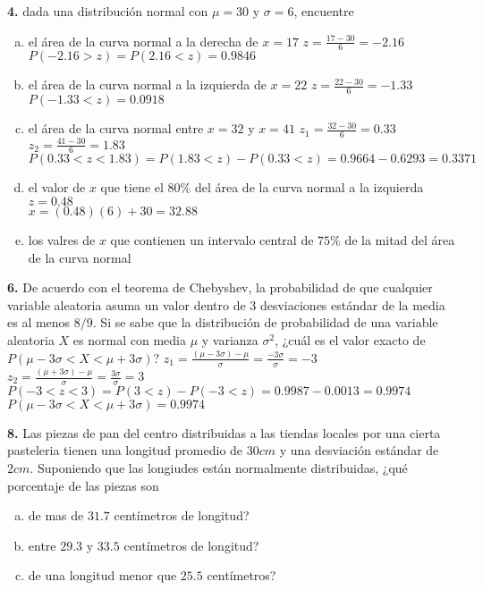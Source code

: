 \documentclass[12pt, letterpaper]{article}
\begin{document}
    \textbf{4. } dada una distribución normal con $\mu = 30$ y $\sigma = 6$, encuentre
        \begin{enumerate}[a)]
            \item el área de la curva normal a la derecha de $x=17$\vskip0.5cm
                $z=\displaystyle\frac{17-30}{6}=-2.16$\vskip0.5cm
                $P(-2.16>z)=P(2.16<z)=0.9846$
            \item el área de la curva normal a la izquierda de $x=22$\vskip0.5cm
                $z=\displaystyle\frac{22-30}{6}=-1.33$\vskip0.5cm
                $P(-1.33<z)=0.0918$
            \item el área de la curva normal entre $x=32$ y $x=41$\vskip0.5cm
                $z_1=\displaystyle\frac{32-30}{6}=0.33$\vskip0.5cm
                $z_2=\displaystyle\frac{41-30}{6}=1.83$\vskip0.5cm
                $P(0.33<z<1.83)=P(1.83<z)-P(0.33<z)=0.9664-0.6293=0.3371$
            \item el valor de $x$ que tiene el $80\%$ del área de la curva normal a la izquierda\\
                $z=0.48$\\
                $x=(0.48)(6)+30=32.88$
            \item los valres de $x$ que contienen un intervalo central de $75\%$ de la mitad del área de la curva normal

        \end{enumerate}\vskip1cm

    \textbf{6. }De acuerdo con el teorema de Chebyshev, la probabilidad de que cualquier variable aleatoria asuma un valor
    dentro de 3 desviaciones estándar de la media es al menos $8/9$. Si se sabe que la distribución de probabilidad de
    una variable aleatoria $X$ es normal con media $\mu$ y varianza $\sigma ^2$, ¿cuál es el valor exacto de
    $P(\mu - 3\sigma <X<\mu + 3\sigma )$?\vskip0.5cm
        $z_1=\displaystyle\frac{(\mu -3\sigma)-\mu}{\sigma}=\frac{-3\sigma}{\sigma}=-3$\vskip0.5cm
        $z_2=\displaystyle\frac{(\mu +3\sigma)-\mu}{\sigma}=\frac{3\sigma}{\sigma}=3$\vskip0.5cm
        $P(-3<z<3)=P(3<z)-P(-3<z)=0.9987-0.0013=0.9974$\vskip0.5cm
        $P(\mu - 3\sigma <X<\mu + 3\sigma )=0.9974$
    \vskip1cm


    \textbf{8. }Las piezas de pan del centro distribuidas a las tiendas locales por una cierta pasteleria tienen una
    longitud promedio de $30cm$ y una desviación estándar de $2cm$. Suponiendo que las longiudes  están normalmente
    distribuidas, ¿qué porcentaje de las piezas son
        \begin{enumerate}[a)]
            \item de mas de $31.7$ centímetros de longitud?
            \item entre $29.3$ y $33.5$ centímetros de longitud?
            \item de una longitud menor que $25.5$ centímetros?
        \end{enumerate}\vskip1cm
\end{document}
